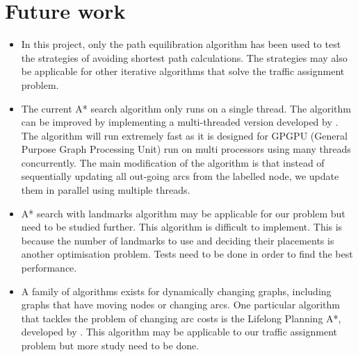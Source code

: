 \section{Future work}
\begin{itemize}
    \item In this project, only the path equilibration algorithm has been used to test the strategies of avoiding shortest path calculations.
        The strategies may also be applicable for other iterative algorithms that solve the traffic assignment problem.

    \item The current A* search algorithm only runs on a single thread.
        The algorithm can be improved by implementing a multi-threaded version developed
        by \citet{Inam}.
        The algorithm will run extremely fast as it is designed for GPGPU (General Purpose Graph Processing Unit) run on multi processors using many threads concurrently.
        The main modification of the algorithm is that instead of sequentially updating all out-going arcs from the labelled node,
        we update them in parallel using multiple threads.

    \item A* search with landmarks algorithm may be applicable for our problem but need to be studied further.
        This algorithm is difficult to implement. 
        This is because the number of landmarks to use and deciding their placements is another optimisation problem.
        Tests need to be done in order to find the best performance.

    \item A family of algorithms exists for dynamically changing graphs,
        including graphs that have moving nodes or changing arcs.
        One particular algorithm that tackles the problem of changing arc costs is the Lifelong Planning A*, developed by \citet{LPA*}.
        This algorithm may be applicable to our traffic assignment problem but more study need to be done.
\end{itemize}



